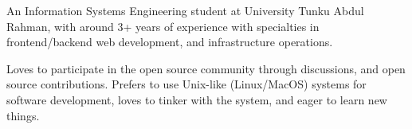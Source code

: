 

\begin{cvparagraph}

An Information Systems Engineering student at University Tunku Abdul Rahman, with around 3+ years of experience with specialties in frontend/backend web development, and infrastructure operations.

Loves to participate in the open source community through discussions, and open source contributions. Prefers to use Unix-like (Linux/MacOS) systems for software development, loves to tinker with the system, and eager to learn new things. 
\end{cvparagraph}
